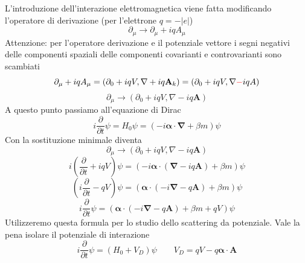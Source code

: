 L'introduzione dell'interazione elettromagnetica viene fatta modificando l'operatore di derivazione (per l'elettrone $q=-|e|$)
$$
\partial_\mu \to \partial_\mu + iqA_\mu
$$
Attenzione: per l'operatore derivazione e il potenziale vettore i segni negativi delle componenti spaziali delle componenti covarianti e controvarianti sono scambiati
$$
\partial_\mu + iqA_\mu = (\partial_0 + iqV, \nabla + iq\mathbf{A}_k) = (\partial_0 + iqV, \nabla \textcolor{red}{-} iqA)
$$
$$
\partial_\mu \to (\partial_0 + iqV, \nabla - iq\mathbf{A})
$$
A questo punto passiamo all'equazione di Dirac
$$
i \frac{\partial}{\partial t} \psi = H_0 \psi = (-i\boldsymbol{\alpha} \cdot \boldsymbol{\nabla} + \beta m)\psi
$$
Con la sostituzione minimale diventa
$$
\partial_\mu \to (\partial_0 + iqV, \nabla - iq\mathbf{A})
$$
$$
i \left( \frac{\partial}{\partial t} + iqV \right) \psi = (-i\boldsymbol{\alpha} \cdot (\boldsymbol{\nabla} - iq\mathbf{A}) + \beta m)\psi
$$
$$
\left( i \frac{\partial}{\partial t} - qV \right) \psi = (\boldsymbol{\alpha} \cdot (-i\boldsymbol{\nabla} - q\mathbf{A}) + \beta m)\psi
$$
$$
i \frac{\partial}{\partial t} \psi = (\boldsymbol{\alpha} \cdot (-i\boldsymbol{\nabla} - q\mathbf{A}) + \beta m + qV)\psi
$$
Utilizzeremo questa formula per lo studio dello scattering da potenziale. Vale la pena isolare il potenziale di interazione
$$
i \frac{\partial}{\partial t} \psi = (H_0 + V_D)\psi \qquad V_D = qV - q\boldsymbol{\alpha} \cdot \mathbf{A}
$$
